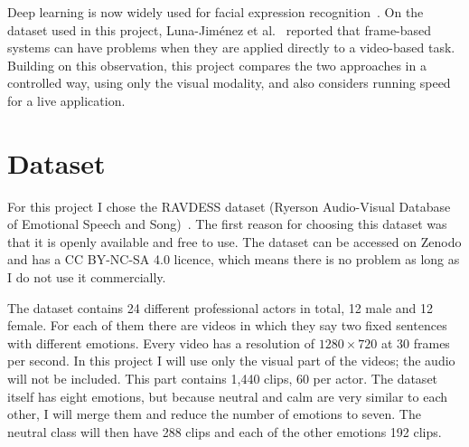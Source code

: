\documentclass[10pt,a4paper,twocolumn]{article}
\begin{document}
Deep learning is now widely used for facial expression recognition~\cite{lideng}. On the dataset used in this project, Luna-Jim\'enez et al.~\cite{luna} reported that frame-based systems can have problems when they are applied directly to a video-based task. Building on this observation, this project compares the two approaches in a controlled way, using only the visual modality, and also considers running speed for a live application.

\vspace{1.2ex}
\begin{center}
\label{fig:system}
\end{center}

\newpage %
\section{Dataset}
\enlargethispage{1.2\baselineskip}
For this project I chose the RAVDESS dataset (Ryerson Audio-Visual Database of Emotional Speech and Song)~\cite{ravdess}. The first reason for choosing this dataset was that it is openly available and free to use. The dataset can be accessed on Zenodo and has a CC BY-NC-SA 4.0 licence, which means there is no problem as long as I do not use it commercially.

The dataset contains 24 different professional actors in total, 12 male and 12 female. For each of them there are videos in which they say two fixed sentences with different emotions. Every video has a resolution of $1280\times720$ at 30 frames per second. In this project I will use only the visual part of the videos; the audio will not be included. This part contains 1,440 clips, 60 per actor. The dataset itself has eight emotions, but because neutral and calm are very similar to each other, I will merge them and reduce the number of emotions to seven. The neutral class will then have 288 clips and each of the other emotions 192 clips.
\end{document}
